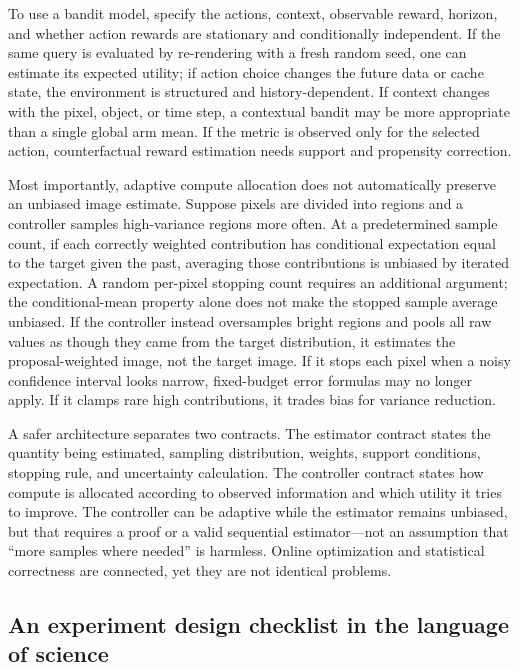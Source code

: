 To use a bandit model, specify the actions, context, observable reward, horizon, and whether action rewards are stationary and conditionally independent. If the same query is evaluated by re-rendering with a fresh random seed, one can estimate its expected utility; if action choice changes the future data or cache state, the environment is structured and history-dependent. If context changes with the pixel, object, or time step, a contextual bandit may be more appropriate than a single global arm mean. If the metric is observed only for the selected action, counterfactual reward estimation needs support and propensity correction.

Most importantly, adaptive compute allocation does not automatically preserve an unbiased image estimate. Suppose pixels are divided into regions and a controller samples high-variance regions more often. At a predetermined sample count, if each correctly weighted contribution has conditional expectation equal to the target given the past, averaging those contributions is unbiased by iterated expectation. A random per-pixel stopping count requires an additional argument; the conditional-mean property alone does not make the stopped sample average unbiased. If the controller instead oversamples bright regions and pools all raw values as though they came from the target distribution, it estimates the proposal-weighted image, not the target image. If it stops each pixel when a noisy confidence interval looks narrow, fixed-budget error formulas may no longer apply. If it clamps rare high contributions, it trades bias for variance reduction.

A safer architecture separates two contracts. The estimator contract states the quantity being estimated, sampling distribution, weights, support conditions, stopping rule, and uncertainty calculation. The controller contract states how compute is allocated according to observed information and which utility it tries to improve. The controller can be adaptive while the estimator remains unbiased, but that requires a proof or a valid sequential estimator---not an assumption that ``more samples where needed'' is harmless. Online optimization and statistical correctness are connected, yet they are not identical problems.

\subsection{An experiment design checklist in the language of science}\label{03-visual-computing-i-ch012-an-experiment-design-checklist-in-the-language-of-science}

